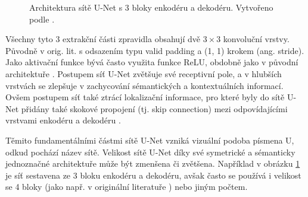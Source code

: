 \begin{figure}[H]

\caption[Příkladná architektura sítě U-Net]{Architektura sítě U-Net s 3 bloky enkodéru a dekodéru. Vytvořeno podle \cite{unet}. }
\label{fig:unetdiagram}

\end{figure}

Všechny tyto 3 extrakční části zpravidla obsahují dvě $3\times3$ konvoluční vrstvy. Původně v orig. lit. s odsazením typu valid padding a (1, 1) krokem (ang. stride). Jako aktivační funkce bývá často využita funkce ReLU, obdobně jako v původní architektuře \cite{unet}. Postupem síť U-Net zvětšuje své receptivní pole, a v hlubších vrstvách se zlepšuje v zachycování sémantických a kontextuálních informací. Ovšem postupem síť také ztrácí lokalizační informace, pro které byly do sítě U-Net přidány také skokové propojení (tj. skip connection) mezi odpovídajícími vrstvami enkodéru a dekodéru \cite{unet_success}.

Těmito fundamentálními částmi sítě U-Net vzniká vizuální podoba písmena U, odkud pochází název sítě. Velikost sítě U-Net díky své symetrické a sémanticky jednoznačné architektuře může být zmenšena či zvětšena. Například v obrázku \ref{fig:unetdiagram} je síť sestavena ze 3 bloku enkodéru a dekodéru, avšak často se používá i velikost se 4 bloky (jako např. v originální literatuře \cite{unet}) nebo jiným počtem.

